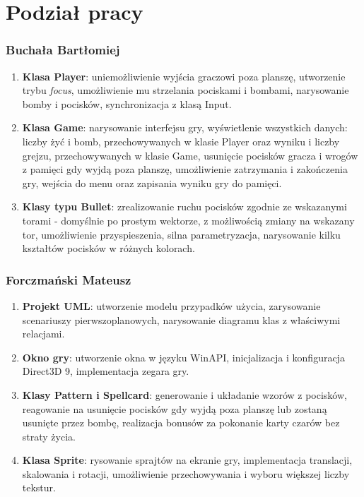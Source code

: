 \documentclass[a4paper,twoside]{article}
\begin{document}
	
	\newpage
	
	\part{Podział pracy}
		
		\section{Buchała Bartłomiej}
			\begin{enumerate}[label=\alph*.]
				\item \textbf{Klasa Player}: uniemożliwienie wyjścia graczowi poza planszę, utworzenie trybu \emph{focus}, umożliwienie mu strzelania pociskami i bombami, narysowanie bomby i pocisków, synchronizacja z klasą Input.
				\item \textbf{Klasa Game}: narysowanie interfejsu gry, wyświetlenie wszystkich danych: liczby żyć i bomb, przechowywanych w klasie Player oraz wyniku i liczby grejzu, przechowywanych w klasie Game, usunięcie pocisków gracza i wrogów z pamięci gdy wyjdą poza planszę, umożliwienie zatrzymania i zakończenia gry, wejścia do menu oraz zapisania wyniku gry do pamięci.
				\item \textbf{Klasy typu Bullet}: zrealizowanie ruchu pocisków zgodnie ze wskazanymi torami - domyślnie po prostym wektorze, z możliwością zmiany na wskazany tor, umożliwienie przyspieszenia, silna parametryzacja, narysowanie kilku kształtów pocisków w różnych kolorach.
			\end{enumerate}
		
		\section{Forczmański Mateusz}
			\begin{enumerate}[label=\alph*.]
				\item \textbf{Projekt UML}: utworzenie modelu przypadków użycia, zarysowanie scenariuszy pierwszoplanowych, narysowanie diagramu klas z właściwymi relacjami.
				\item \textbf{Okno gry}: utworzenie okna w języku WinAPI, inicjalizacja i konfiguracja Direct3D 9, implementacja zegara gry.
				\item \textbf{Klasy Pattern i Spellcard}: generowanie i układanie wzorów z pocisków, reagowanie na usunięcie pocisków gdy wyjdą poza planszę lub zostaną usunięte przez bombę, realizacja bonusów za pokonanie karty czarów bez straty życia.
				\item \textbf{Klasa Sprite}: rysowanie sprajtów na ekranie gry, implementacja translacji, skalowania i rotacji, umożliwienie przechowywania i wyboru większej liczby tekstur.
			\end{enumerate}
		
\end{document}
